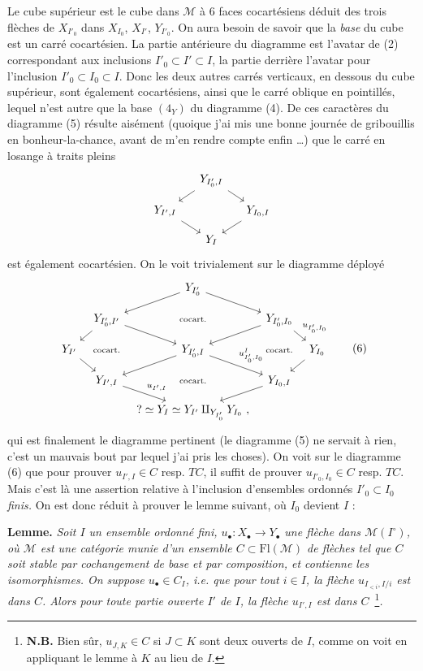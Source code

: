 \documentclass[11pt]{article}
\newcommand{\printedpage}[1]{\marginpar{\footnotesize p.~#1}}
\newcommand{\msp}[1]{\marginpar{\footnotesize [#1]}}
\newcommand{\cocart}{\text{\scriptsize cocart.}}
\begin{document}
Le cube supérieur est le cube dans $\mathcal{M}$ à 6 faces cocartésiens déduit des trois flèches de $X_{I'_0}$ dans $X_{I_0}$, $X_{I'}$, $Y_{I'_0}$. %
On aura besoin de savoir que la \textit{base} du cube est un carré cocartésien. La partie antérieure du diagramme est l'avatar de (2) correspondant aux inclusions $I'_0 \subset I' \subset I$, la partie derrière l'avatar pour l'inclusion $I'_0 \subset I_0 \subset I$. Donc les deux autres carrés verticaux, en dessous du cube supérieur, sont également cocartésiens, ainsi que le carré oblique en pointillés, lequel n'est autre que la base $(4_Y)$ du diagramme (4). De ces caractères du diagramme (5) résulte aisément (quoique \msp{page 17} j'ai mis une bonne journée de gribouillis en bonheur-la-chance, avant de m'en rendre compte enfin \ldots) que le carré en losange à traits pleins
\[
\begin{tikzcd}[column sep=small, row sep=small]
 & Y_{I'_0,I} \arrow[dl] \arrow[dr] & \\
Y_{I',I} \arrow[dr] & & Y_{I_0,I} \arrow[dl] \\
 & Y_I &
\end{tikzcd}
\]
est également cocartésien. On le voit trivialement sur le diagramme déployé
\printedpage{11}
\[
\begin{tikzcd}[column sep=tiny, row sep=small]
 & & Y_{I'_0} \arrow[dl] \arrow[dr] & & \\
 & Y_{I'_0,I'} \arrow[dl] \arrow[dr] & \cocart & Y_{I'_0,I_0} \arrow[dl] \arrow[dr, "u_{I'_0,I_0}"] & \\
Y_{I'} \arrow[dr] & \cocart & Y_{I'_0,I} \arrow[dl] \arrow[dr, "u^I_{I'_0,I_0}"] & \cocart & Y_{I_0} \arrow[dl] \\
 & Y_{I',I} \arrow[dr, "u_{I',I}"] & \cocart & Y_{I_0,I} \arrow[dl] & \\
 & & {?\simeq Y_I \simeq Y_{I'} \amalg_{Y_{I'_0}} Y_{I_0}\ ,} & &
\end{tikzcd} %
\tag*{(6)}
\]
qui est finalement le diagramme pertinent (le diagramme (5) ne servait à rien, c'est un mauvais bout par lequel j'ai pris les choses). On voit sur le diagramme (6) que pour prouver $u_{I',I} \in C$ resp. $TC$, il \msp{page 18} suffit de prouver $u_{I'_0,I_0} \in C$ resp. $TC$. Mais c'est là une assertion relative à l'inclusion d'ensembles ordonnés $I'_0 \subset I_0$ \textit{finis.} On est donc réduit à prouver le lemme suivant, où $I_0$ devient $I$ :

\textbf{Lemme.} \textit{Soit $I$ un ensemble ordonné fini, $u_\bullet : X_\bullet \longrightarrow Y_\bullet$ une flèche dans $\mathcal{M}(I^\circ)$, où $\mathcal{M}$ est une catégorie munie d'un ensemble $C \subset \mathrm{Fl}(\mathcal{M})$ de flèches tel que $C$ soit stable par cochangement de base et par composition, et contienne les isomorphismes. On suppose $u_\bullet \in C_I$, i.e. que pour tout $i \in I$, la flèche $u_{I_{<i},I/i}$ est dans $C$. Alors pour toute partie ouverte $I'$ de $I$, la flèche $u_{I',I}$ est dans $C$}~\footnote[10]{\textbf{N.B.} Bien sûr, $u_{J,K} \in C$ si $J \subset K$ sont deux ouverts de $I$, comme on voit en appliquant le lemme à $K$ au lieu de $I$.}\textit{.}
\end{document}

